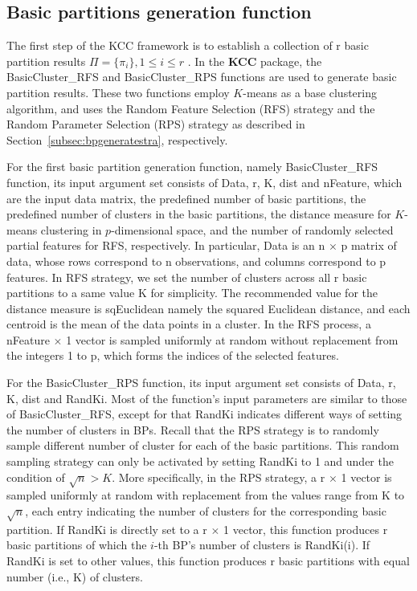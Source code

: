 \documentclass[acmsmall,screen,review]{acmart}
\begin{document}
\subsection{Basic partitions generation function} \label{subsec:gbp}
The first step of the KCC framework is to establish a collection of \textsf{r} basic partition results $\Pi=\{\pi_i\}, 1 \leq i \leq r$ . In the \textbf{KCC} package, the \textsf{BasicCluster\_RFS} and \textsf{BasicCluster\_RPS} functions are used to generate basic partition results. These two functions employ $K$-means as a base clustering algorithm, and uses the Random Feature Selection (RFS) strategy and the Random Parameter Selection (RPS) strategy as described in Section~\ref{subsec:bpgeneratestra}, respectively.

For the first basic partition generation function, namely \textsf{BasicCluster\_RFS} function, its input argument set consists of \textsf{Data}, \textsf{r}, \textsf{K}, \textsf{dist} and \textsf{nFeature}, which are the input data matrix, the predefined number of basic partitions, the predefined number of clusters in the basic partitions, the distance measure for $K$-means clustering in $p$-dimensional space, and the number of randomly selected partial features for RFS, respectively. In particular, \textsf{Data} is an \textsf{n} $\times$ \textsf{p} matrix of data, whose rows correspond to \textsf{n} observations, and columns correspond to \textsf{p} features. In RFS strategy, we set the number of clusters across all \textsf{r} basic partitions to a same value \textsf{K} for simplicity. The recommended value for the distance measure is \textsf{sqEuclidean} namely the squared Euclidean distance, and each centroid is the mean of the data points in a cluster. In the RFS process, a \textsf{nFeature} $\times$ \textsf{1} vector is sampled uniformly at random without replacement from the integers \textsf{1} to \textsf{p}, which forms the indices of the selected features.

For the \textsf{BasicCluster\_RPS} function, its input argument set consists of \textsf{Data}, \textsf{r}, \textsf{K}, \textsf{dist} and \textsf{RandKi}. Most of the function's input parameters are similar to those of \textsf{BasicCluster\_RFS}, except for that \textsf{RandKi} indicates different ways of setting the number of clusters in BPs. Recall that the RPS strategy is to randomly sample different number of cluster for each of the basic partitions. This random sampling strategy can only be activated by setting \textsf{RandKi} to 1 and under the condition of $\sqrt{n} > K$. More specifically, in the RPS strategy, a \textsf{r} $\times$ 1 vector is sampled uniformly at random with replacement from the values range from \textsf{K} to $\sqrt{n}$, each entry indicating the number of clusters for the corresponding basic partition. If \textsf{RandKi} is directly set to a \textsf{r} $\times$ \textsf{1} vector, this function produces \textsf{r} basic partitions of which the $i$-th BP's number of clusters is \textsf{RandKi(i)}. If \textsf{RandKi} is set to other values, this function produces \textsf{r} basic partitions with equal number (i.e., \textsf{K}) of clusters. 
\end{document}
